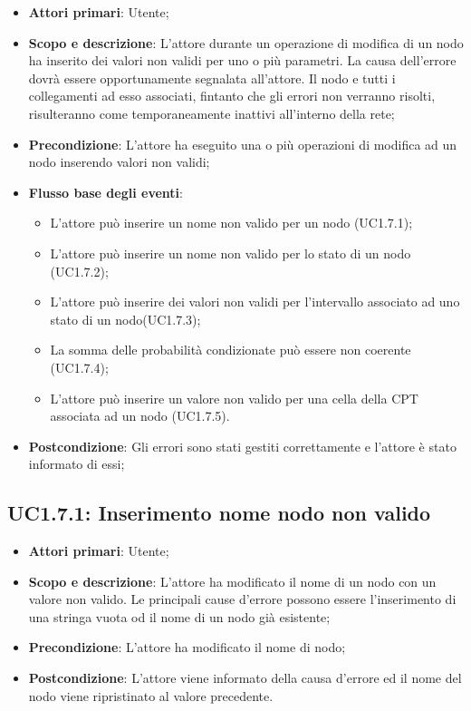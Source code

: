 \begin{itemize} 
	\item{\textbf{Attori primari}: Utente;} 
	\item{\textbf{Scopo e descrizione}: L'attore durante un operazione di modifica di un nodo ha inserito dei valori non validi per uno o più parametri. La causa dell'errore dovrà essere opportunamente segnalata all'attore. Il nodo e tutti i collegamenti ad esso associati, fintanto che gli errori non verranno risolti, risulteranno come temporaneamente inattivi all'interno della rete;} 
	\item{\textbf{Precondizione}: L'attore ha eseguito una o più operazioni di modifica ad un nodo inserendo valori non validi;} 
	\item{\textbf{Flusso base degli eventi}: } 
	\begin{itemize} 
		\item{L'attore può inserire un nome non valido per un nodo (UC1.7.1);} 
		\item{L'attore può inserire un nome non valido per lo stato di un nodo (UC1.7.2);} 
		\item{L'attore può inserire dei valori non validi per l'intervallo associato ad uno stato di un nodo(UC1.7.3);} 
		\item{La somma delle probabilità condizionate può essere non coerente (UC1.7.4);} 
		\item{L'attore può inserire un valore non valido per una cella della CPT associata ad un nodo (UC1.7.5).} 
	\end{itemize} 
	\item{\textbf{Postcondizione}: Gli errori sono stati gestiti correttamente e l'attore è stato informato di essi;} 
\end{itemize} 
\subsection{UC1.7.1: Inserimento nome nodo non valido} 
\begin{itemize} 
	\item{\textbf{Attori primari}: Utente;} 
	\item{\textbf{Scopo e descrizione}: L'attore ha modificato il nome di un nodo con un valore non valido. Le principali cause d'errore possono essere l'inserimento di una stringa vuota od il nome di un nodo già esistente;} 
	\item{\textbf{Precondizione}: L'attore ha modificato il nome di nodo;} 
	\item{\textbf{Postcondizione}: L'attore viene informato della causa d'errore ed il nome del nodo viene ripristinato al valore precedente.} 
\end{itemize} 
